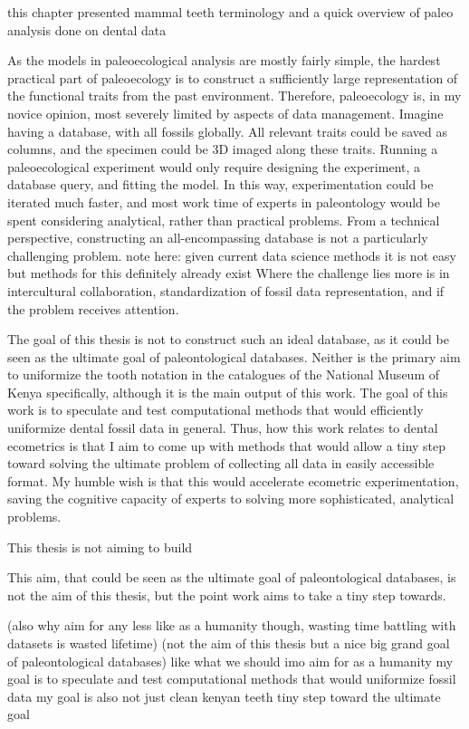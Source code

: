 \documentclass{article}
\begin{document}
this chapter presented mammal teeth terminology and a quick overview of paleo analysis done on dental data

As the models in paleoecological analysis are mostly fairly simple,
the hardest practical part of paleoecology is to construct a sufficiently large representation of the functional traits
 from the past environment. Therefore, paleoecology is, in my novice opinion, most severely limited by aspects
  of data management. Imagine having a database, with all fossils globally. All relevant traits could be saved
   as columns, and the specimen could be 3D imaged along these traits. Running a paleoecological experiment would only 
   require designing the experiment, a database query, and fitting the model. In this way, experimentation 
   could be iterated much faster, and most work time of experts in paleontology would be spent considering analytical,
    rather than practical problems. From a technical perspective, constructing an all-encompassing database is not a particularly challenging problem.
    note here: given current data science methods it is not easy but methods for this definitely already exist
    Where the challenge lies more is in intercultural collaboration, standardization of fossil data representation, and if the problem receives attention.

The goal of this thesis is not to construct such an ideal database, as it could be seen as the ultimate goal of paleontological databases. 
Neither is the primary aim to uniformize the tooth notation in the catalogues of the National Museum of Kenya specifically, although
it is the main output of this work. The goal of this work is to speculate and test computational methods that would efficiently 
uniformize dental fossil data in general.
Thus, how this work relates to dental ecometrics is that I aim to come up with methods that would allow a tiny step toward solving the ultimate problem of 
collecting all data in easily accessible format. My humble wish is that this would accelerate ecometric experimentation, saving the cognitive capacity 
of experts to solving more sophisticated, analytical problems.

This thesis is not aiming to build     

This aim, that could be seen as the ultimate goal of paleontological databases, is not the aim of this thesis, but the point work aims to take a tiny step towards.

 (also why aim for any less like as a humanity though, wasting time battling with datasets is wasted lifetime)
(not the aim of this thesis but a nice big grand goal of paleontological databases)
like what we should imo aim for as a humanity
my goal is to speculate and test computational methods that would uniformize fossil data
my goal is also not just clean kenyan teeth
tiny step toward the ultimate goal
\end{document}
